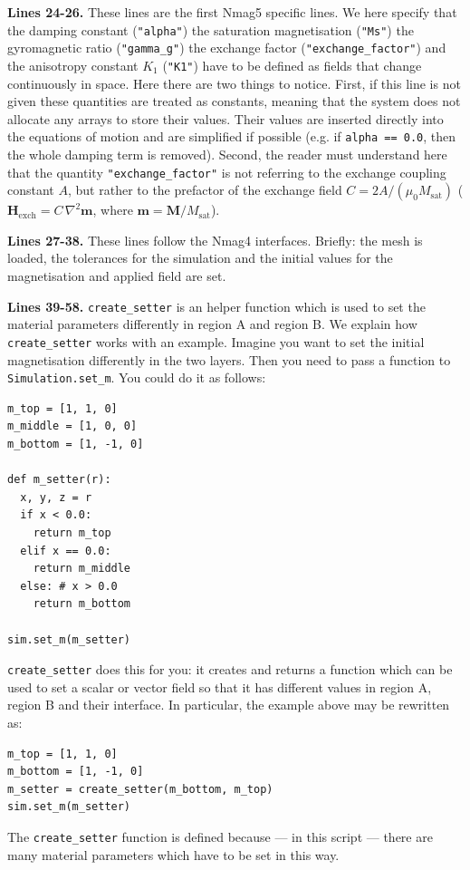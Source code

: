 \documentclass[11pt,oneside,openany]{article}
\newcommand{\Ms}{M_{\mathrm{sat}}}
\begin{document}
\textbf{Lines 24-26.} These lines are the first Nmag5 specific lines.
We here specify that the damping constant (\verb|"alpha"|) the saturation
magnetisation (\verb|"Ms"|) the gyromagnetic ratio (\verb|"gamma_g"|)
the exchange factor (\verb|"exchange_factor"|) and the anisotropy constant
$K_1$ (\verb|"K1"|) have to be defined as fields that change continuously
in space. Here there are two things to notice. First, if this line is not
given these quantities are treated as constants, meaning that the system
does not allocate any arrays to store their values. Their values are inserted
directly into the equations of motion and are simplified if possible
(e.g. if \verb|alpha == 0.0|, then the whole damping term is removed).
Second, the reader must understand here that the quantity
\verb|"exchange_factor"| is not referring to the exchange coupling constant
$A$, but rather to the prefactor of the exchange field 
$C = 2A/(\mu_0 \Ms)$ 
($\mathbf{H_{\mathrm{exch}}} = C \, \nabla^2 \mathbf{m}$,
where $\mathbf{m} = \mathbf{M}/\Ms$).

\textbf{Lines 27-38.} These lines follow the Nmag4 interfaces.
Briefly: the mesh is loaded, the tolerances for the simulation and
the initial values for the magnetisation and applied field are set.

\textbf{Lines 39-58.} \verb|create_setter| is an helper function which is used
to set the material parameters differently in region A and region B.  We
explain how \verb|create_setter| works with an example.  Imagine you want to
set the initial magnetisation differently in the two layers. Then you need to
pass a function to \verb|Simulation.set_m|. You could do it as follows:
\begin{lstlisting}
m_top = [1, 1, 0]
m_middle = [1, 0, 0]
m_bottom = [1, -1, 0]

def m_setter(r):
  x, y, z = r
  if x < 0.0:
    return m_top
  elif x == 0.0:
    return m_middle
  else: # x > 0.0
    return m_bottom

sim.set_m(m_setter)
\end{lstlisting}
\verb|create_setter| does this for you: it creates and returns a function which
can be used to set a scalar or vector field so that it has different values in
region A, region B and their interface. In particular, the example above may be
rewritten as:
\begin{lstlisting}
m_top = [1, 1, 0]
m_bottom = [1, -1, 0]
m_setter = create_setter(m_bottom, m_top)
sim.set_m(m_setter)
\end{lstlisting}
The \verb|create_setter| function is defined because --- in this script ---
there are many material parameters which have to be set in this way.
\end{document}
